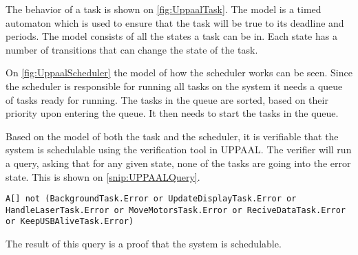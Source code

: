 The behavior of a task is shown on \autoref{fig:UppaalTask}.
The model is a timed automaton which is used to ensure that the task will be true to its deadline and periods.
The model consists of all the states a task can be in.
Each state has a number of transitions that can change the state of the task.


On \autoref{fig:UppaalScheduler} the model of how the scheduler works can be seen.
Since the scheduler is responsible for running all tasks on the system it needs a queue of tasks ready for running.
The tasks in the queue are sorted, based on their priority upon entering the queue.
It then needs to start the tasks in the queue.


Based on the model of both the task and the scheduler, it is verifiable that the system is schedulable using the verification tool in UPPAAL.
The verifier will run a query, asking that for any given state, none of the tasks are going into the error state.
This is shown on \autoref{snip:UPPAALQuery}.
\begin{lstlisting}[label={snip:UPPAALQuery},caption={Query from UPPAAL verifier},frame=tlrb,numbers=none]
A[] not (BackgroundTask.Error or UpdateDisplayTask.Error or HandleLaserTask.Error or MoveMotorsTask.Error or ReciveDataTask.Error or KeepUSBAliveTask.Error)
\end{lstlisting}
The result of this query is a proof that the system is schedulable.
